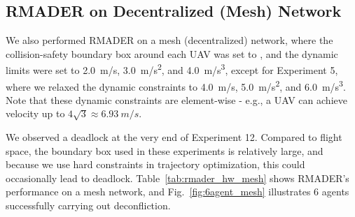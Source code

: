 \subsection{RMADER on Decentralized (Mesh) Network}
We also performed RMADER on a mesh (decentralized) network, where the collision-safety boundary box around each UAV was set to , and the dynamic limits were set to \SI{2.0}{\m/\s}, \SI{3.0}{\m/\s^2}, and \SI{4.0}{\m/\s^3}, except for Experiment 5, where we relaxed the dynamic constraints to \SI{4.0}{\m/\s}, \SI{5.0}{\m/\s^2}, and \SI{6.0}{\m/\s^3}. Note that these dynamic constraints are element-wise - e.g., a UAV can achieve velocity up to $4\sqrt{3} \approx \SI{6.93}{m/s}$.

We observed a deadlock at the very end of Experiment 12. Compared to flight space, the boundary box used in these experiments is relatively large, and because we use hard constraints in trajectory optimization, this could occasionally lead to deadlock. Table~\ref{tab:rmader_hw_mesh} shows RMADER's performance on a mesh network, and Fig.~\ref{fig:6agent_mesh} illustrates 6 agents successfully carrying out deconfliction.

